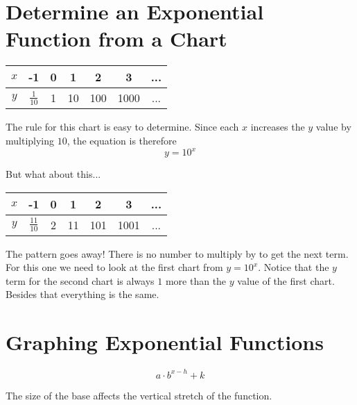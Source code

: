 \documentclass[12pt]{article}
\begin{document}
\section*{Determine an Exponential Function from a Chart}

\begin{center}
{\renewcommand{\arraystretch}{2}
\begin{tabular}{c|c|c|c|c|c|c}

$x$ & -1 & 0 & 1 & 2 & 3  & ...\\ \hline
$y$ & $\frac{1}{10}$ & 1 & 10 & 100 & 1000 & ...\\ 

\end{tabular}} \quad
\end{center}

The rule for this chart is easy to determine. Since each $x$ increases the $y$ value by multiplying $10$, the equation is therefore $$y=10^x$$

But what about this...\\

\begin{center}
{\renewcommand{\arraystretch}{2}
\begin{tabular}{c|c|c|c|c|c|c}

$x$ & -1 & 0 & 1 & 2 & 3 & ... \\ \hline
$y$ & $\frac{11}{10}$ & 2 & 11 & 101 & 1001 & ... \\ 

\end{tabular}} \quad
\end{center}

The pattern goes away! There is no number to multiply by to get the next term. For this one we need to look at the first chart from $y=10^x$. Notice that the $y$ term for the second chart is always $1$ more than the $y$ value of the first chart. Besides that everything is the same.\\




\pagebreak


\section*{Graphing Exponential Functions}

$$a\cdot b^{x-h}+k$$

The size of the base affects the vertical stretch of the function.\\
\end{document}
